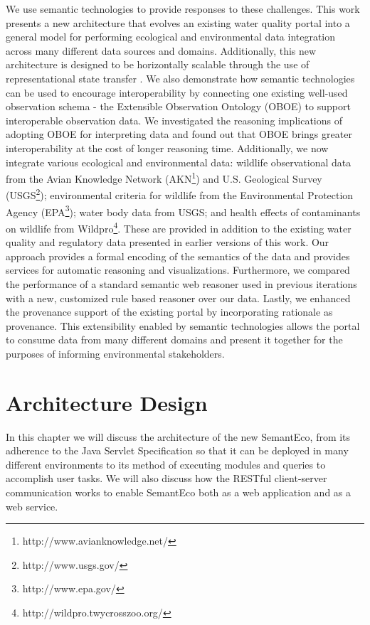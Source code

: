 \documentclass[letterpaper]{report}
\begin{document}
We use semantic technologies to provide responses to these challenges. This work presents a new architecture that evolves an existing water quality portal into a general model for performing ecological and environmental data integration across many different data sources and domains. Additionally, this new architecture is designed to be horizontally scalable through the use of representational state transfer \cite{REST}. We also demonstrate how semantic technologies can be used to encourage interoperability by connecting one existing well-used observation schema - the Extensible Observation Ontology (OBOE) \cite{OBOE} to support interoperable observation data. We investigated the reasoning implications of adopting OBOE for interpreting data and found out that OBOE brings greater interoperability at the cost of longer reasoning time. Additionally, we now integrate various ecological and environmental data: wildlife observational data from the Avian Knowledge Network (AKN\footnote{http://www.avianknowledge.net/}) and U.S. Geological Survey (USGS\footnote{http://www.usgs.gov/}); environmental criteria for wildlife from the Environmental Protection Agency (EPA\footnote{http://www.epa.gov/}); water body data from USGS; and health effects of contaminants on wildlife from Wildpro\footnote{http://wildpro.twycrosszoo.org/}. These are provided in addition to the existing water quality and regulatory data presented in earlier versions of this work. Our approach provides a formal encoding of the semantics of the data and provides services for automatic reasoning and visualizations. Furthermore, we compared the performance of a standard semantic web reasoner used in previous iterations with a new, customized rule based reasoner over our data. Lastly, we enhanced the provenance support of the existing portal by incorporating rationale as provenance. This extensibility enabled by semantic technologies allows the portal to consume data from many different domains and present it together for the purposes of informing environmental stakeholders.

\chapter{Architecture Design}
\label{architecture}
In this chapter we will discuss the architecture of the new SemantEco, from its adherence to the Java Servlet Specification so that it can be deployed in many different environments to its method of executing modules and queries to accomplish user tasks. We will also discuss how the RESTful client-server communication works to enable SemantEco both as a web application and as a web service.
\end{document}
